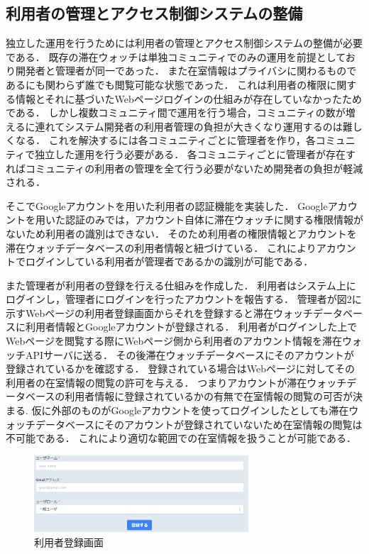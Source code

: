 
\subsection{利用者の管理とアクセス制御システムの整備}
独立した運用を行うためには利用者の管理とアクセス制御システムの整備が必要である．
既存の滞在ウォッチは単独コミュニティでのみの運用を前提としており開発者と管理者が同一であった．
また在室情報はプライバシに関わるものであるにも関わらず誰でも閲覧可能な状態であった．
これは利用者の権限に関する情報とそれに基づいたWebページログインの仕組みが存在していなかったためである．
しかし複数コミュニティ間で運用を行う場合，コミュニティの数が増えるに連れてシステム開発者の利用者管理の負担が大きくなり運用するのは難しくなる．
これを解決するには各コミュニティごとに管理者を作り，各コミュニティで独立した運用を行う必要がある．
各コミュニティごとに管理者が存在すればコミュニティの利用者の管理を全て行う必要がないため開発者の負担が軽減される．

そこでGoogleアカウントを用いた利用者の認証機能を実装した．
Googleアカウントを用いた認証のみでは，アカウント自体に滞在ウォッチに関する権限情報がないため利用者の識別はできない．
そのため利用者の権限情報とアカウントを滞在ウォッチデータベースの利用者情報と紐づけている．
これによりアカウントでログインしている利用者が管理者であるかの識別が可能である．

また管理者が利用者の登録を行える仕組みを作成した．
利用者はシステム上にログインし，管理者にログインを行ったアカウントを報告する．
管理者が図2に示すWebページの利用者登録画面からそれを登録すると滞在ウォッチデータベースに利用者情報とGoogleアカウントが登録される．
利用者がログインした上でWebページを閲覧する際にWebページ側から利用者のアカウント情報を滞在ウォッチAPIサーバに送る．
その後滞在ウォッチデータベースにそのアカウントが登録されているかを確認する．
登録されている場合はWebページに対してその利用者の在室情報の閲覧の許可を与える．
つまりアカウントが滞在ウォッチデータベースの利用者情報に登録されているかの有無で在室情報の閲覧の可否が決まる.
仮に外部のものがGoogleアカウントを使ってログインしたとしても滞在ウォッチデータベースにそのアカウントが登録されていないため在室情報の閲覧は不可能である．
これにより適切な範囲での在室情報を扱うことが可能である．


\begin{figure}[tbh]
  \centering
  \includegraphics[width=8cm]{image/register.png}
  \caption{利用者登録画面}
  \label{multipleBPM}
\end{figure}